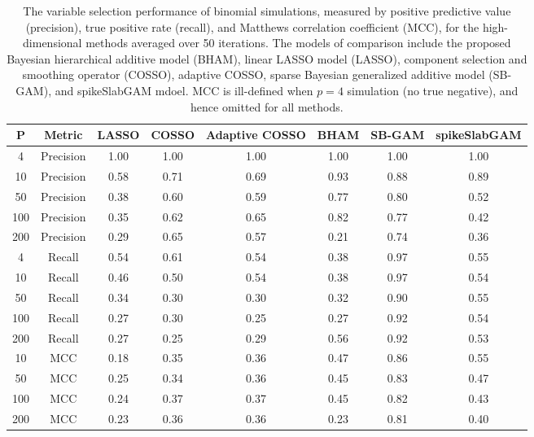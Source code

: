\begin{table}[ht]
\centering
\begin{tabular}{cccccccc}
  \hline
P & Metric & LASSO & COSSO & Adaptive COSSO & BHAM & SB-GAM & spikeSlabGAM \\ 
  \hline
  4 & Precision & 1.00 & 1.00 & 1.00 & 1.00 & 1.00 & 1.00 \\ 
   10 & Precision & 0.58 & 0.71 & 0.69 & 0.93 & 0.88 & 0.89 \\ 
   50 & Precision & 0.38 & 0.60 & 0.59 & 0.77 & 0.80 & 0.52 \\ 
  100 & Precision & 0.35 & 0.62 & 0.65 & 0.82 & 0.77 & 0.42 \\ 
  200 & Precision & 0.29 & 0.65 & 0.57 & 0.21 & 0.74 & 0.36 \\ 
   \hline
  4 & Recall & 0.54 & 0.61 & 0.54 & 0.38 & 0.97 & 0.55 \\ 
   10 & Recall & 0.46 & 0.50 & 0.54 & 0.38 & 0.97 & 0.54 \\ 
   50 & Recall & 0.34 & 0.30 & 0.30 & 0.32 & 0.90 & 0.55 \\ 
  100 & Recall & 0.27 & 0.30 & 0.25 & 0.27 & 0.92 & 0.54 \\ 
  200 & Recall & 0.27 & 0.25 & 0.29 & 0.56 & 0.92 & 0.53 \\ 
   \hline
 10 & MCC & 0.18 & 0.35 & 0.36 & 0.47 & 0.86 & 0.55 \\ 
   50 & MCC & 0.25 & 0.34 & 0.36 & 0.45 & 0.83 & 0.47 \\ 
  100 & MCC & 0.24 & 0.37 & 0.37 & 0.45 & 0.82 & 0.43 \\ 
  200 & MCC & 0.23 & 0.36 & 0.36 & 0.23 & 0.81 & 0.40 \\ 
   \hline
\end{tabular}
\caption{The variable selection performance of binomial simulations,
                         measured by positive predictive value (precision), true positive rate (recall),
                         and Matthews correlation coefficient (MCC), for the high-dimensional methods 
                         averaged over 50 iterations. The models of comparison include the proposed Bayesian
                         hierarchical additive model (BHAM), linear LASSO model (LASSO), component selection and
                         smoothing operator (COSSO), adaptive COSSO, sparse Bayesian generalized additive model (SB-GAM),
                         and spikeSlabGAM mdoel. MCC is ill-defined when $p=4$ simulation (no true negative), and hence omitted for all methods.} 
\label{tab:sim_binom_var_select}
\end{table}

